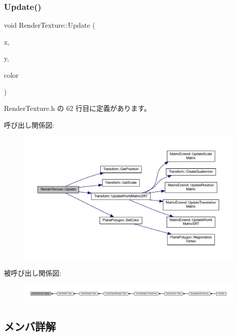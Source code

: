 \subsubsection{\texorpdfstring{Update()}{Update()}}
{\footnotesize\ttfamily void Render\+Texture\+::\+Update (\begin{DoxyParamCaption}\item[{float}]{x,  }\item[{float}]{y,  }\item[{\mbox{\hyperlink{_vector3_d_8h_a680c30c4a07d86fe763c7e01169cd6cc}{X\+Color4}}}]{color }\end{DoxyParamCaption})\hspace{0.3cm}{\ttfamily [inline]}}



 Render\+Texture.\+h の 62 行目に定義があります。

呼び出し関係図\+:
\nopagebreak
\begin{figure}[H]
\begin{center}
\leavevmode
\includegraphics[width=350pt]{class_render_texture_ac27f8cfac7903dd502de61e22abfc457_cgraph}
\end{center}
\end{figure}
被呼び出し関係図\+:
\nopagebreak
\begin{figure}[H]
\begin{center}
\leavevmode
\includegraphics[width=350pt]{class_render_texture_ac27f8cfac7903dd502de61e22abfc457_icgraph}
\end{center}
\end{figure}


\subsection{メンバ詳解}
\mbox{\label{class_render_texture_ad354ed8b9968b5741feb43775cc821b9}} 

